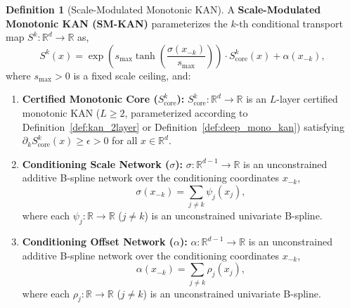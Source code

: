 \documentclass[11pt,a4paper]{article}
\theoremstyle{plain}
\theoremstyle{definition}
\newtheorem{definition}[theorem]{Definition}
\theoremstyle{remark}
\begin{document}
\begin{definition}[Scale-Modulated Monotonic KAN]
\label{def:sm_kan}
A \textbf{Scale-Modulated Monotonic KAN (SM-KAN)} parameterizes the $k$-th conditional transport map $S^k: \mathbb{R}^d \to \mathbb{R}$ as,
\begin{equation}
    S^k(x) = \exp\left( s_{\max} \tanh\left( \frac{\sigma(x_{-k})}{s_{\max}} \right) \right) \cdot S^k_{\text{core}}(x) + \alpha(x_{-k}),
    \label{eq:sm_kan_def}
\end{equation}
where $s_{\max} > 0$ is a fixed scale ceiling, and:
\begin{enumerate}
    \item \textbf{Certified Monotonic Core ($S^k_{\text{core}}$):} $S^k_{\text{core}}: \mathbb{R}^d \to \mathbb{R}$ is an $L$-layer certified monotonic KAN ($L \ge 2$, parameterized according to Definition~\ref{def:kan_2layer} or Definition~\ref{def:deep_mono_kan}) satisfying $\partial_k S^k_{\text{core}}(x) \ge \epsilon > 0$ for all $x \in \mathbb{R}^d$.
    \item \textbf{Conditioning Scale Network ($\sigma$):} $\sigma: \mathbb{R}^{d-1} \to \mathbb{R}$ is an unconstrained additive B-spline network over the conditioning coordinates $x_{-k}$,
    \begin{equation}
        \sigma(x_{-k}) = \sum_{j \neq k} \psi_j(x_j),
        \label{eq:sm_kan_sigma}
    \end{equation}
    where each $\psi_j: \mathbb{R} \to \mathbb{R}$ ($j \neq k$) is an unconstrained univariate B-spline.
    \item \textbf{Conditioning Offset Network ($\alpha$):} $\alpha: \mathbb{R}^{d-1} \to \mathbb{R}$ is an unconstrained additive B-spline network over the conditioning coordinates $x_{-k}$,
    \begin{equation}
        \alpha(x_{-k}) = \sum_{j \neq k} \rho_j(x_j),
        \label{eq:sm_kan_alpha}
    \end{equation}
    where each $\rho_j: \mathbb{R} \to \mathbb{R}$ ($j \neq k$) is an unconstrained univariate B-spline.
\end{enumerate}
\end{definition}
\end{document}
